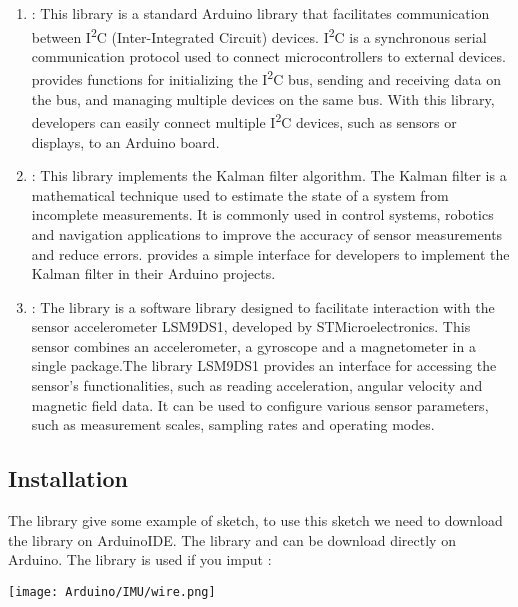 \begin{enumerate}
    \item {}: This library is a standard Arduino library that facilitates communication between I\textsuperscript{2}C (Inter-Integrated Circuit) devices. I\textsuperscript{2}C is a synchronous serial communication protocol used to connect microcontrollers to external devices.  provides functions for initializing the I\textsuperscript{2}C bus, sending and receiving data on the bus, and managing multiple devices on the same bus. With this library, developers can easily connect multiple I\textsuperscript{2}C devices, such as sensors or displays, to an Arduino board.
    
    \item {}: This library implements the Kalman filter algorithm. The Kalman filter is a mathematical technique used to estimate the state of a system from incomplete measurements. It is commonly used in control systems, robotics and navigation applications to improve the accuracy of sensor measurements and reduce errors.  provides a simple interface for developers to implement the Kalman filter in their Arduino projects.
    
    \item {}: The library  is a software library designed to facilitate interaction with the sensor accelerometer LSM9DS1, developed by STMicroelectronics. This sensor combines an accelerometer, a gyroscope and a magnetometer in a single package.The library LSM9DS1 provides an interface for accessing the sensor's functionalities, such as reading acceleration, angular velocity and magnetic field data. It can be used to configure various sensor parameters, such as measurement scales, sampling rates and operating modes.
    
    
\end{enumerate}

\subsection{Installation}

The library give some example of sketch, to use this sketch we need to download the library on ArduinoIDE. The library  and  can be download directly on Arduino. The library  is used if you imput :  

\begin{center}
    \texttt{[image: Arduino/IMU/wire.png]}
\end{center}


